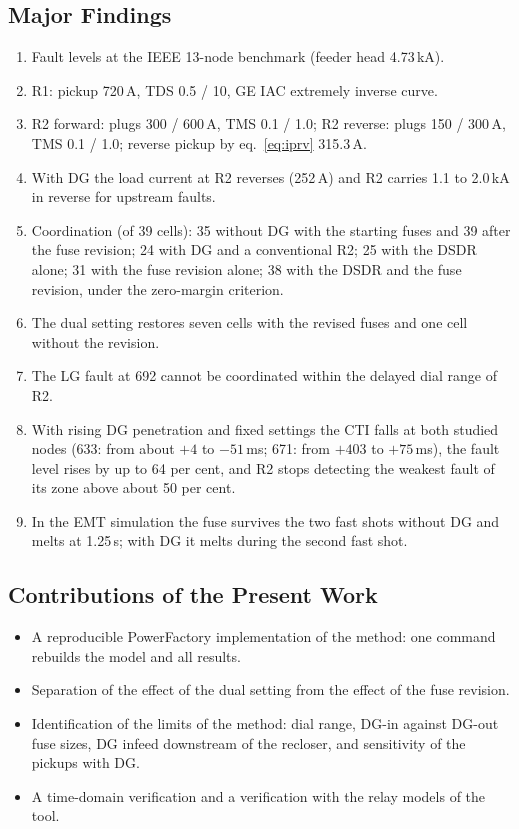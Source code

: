 \documentclass[12pt,a4paper]{article}
\newcommand{\PF}{PowerFactory}
\begin{document}
\subsection{Major Findings}
\begin{enumerate}
\item Fault levels at the IEEE 13-node benchmark (feeder head 4.73\,kA).
\item R1: pickup 720\,A, TDS 0.5 / 10, GE IAC extremely inverse curve.
\item R2 forward: plugs 300 / 600\,A, TMS 0.1 / 1.0; R2 reverse: plugs 150 / 300\,A, TMS 0.1 / 1.0; reverse
      pickup by eq.~\eqref{eq:iprv} 315.3\,A.
\item With DG the load current at R2 reverses (252\,A) and R2 carries 1.1 to 2.0\,kA in reverse for upstream
      faults.
\item Coordination (of 39 cells): 35 without DG with the starting fuses and 39 after the fuse revision;
      24 with DG and a conventional R2; 25 with the DSDR alone; 31 with the fuse revision
      alone; 38 with the DSDR and the fuse revision, under the zero-margin criterion.
\item The dual setting restores seven cells with the revised fuses and one cell without the revision.
\item The LG fault at 692 cannot be coordinated within the delayed dial range of R2.
\item With rising DG penetration and fixed settings the CTI falls at both studied nodes (633: from about
      $+4$ to $-51$\,ms; 671: from $+403$ to $+75$\,ms), the fault level rises by up to 64 per cent, and R2 stops
      detecting the weakest fault of its zone above about 50 per cent.
\item In the EMT simulation the fuse survives the two fast shots without DG and melts at 1.25\,s; with DG it melts during the second fast shot.
\end{enumerate}

\subsection{Contributions of the Present Work}
\begin{itemize}
\item A reproducible \PF{} implementation of the method: one command rebuilds the model and all results.
\item Separation of the effect of the dual setting from the effect of the fuse revision.
\item Identification of the limits of the method: dial range, DG-in against DG-out fuse sizes, DG infeed
      downstream of the recloser, and sensitivity of the pickups with DG.
\item A time-domain verification and a verification with the relay models of the tool.
\end{itemize}
\end{document}
